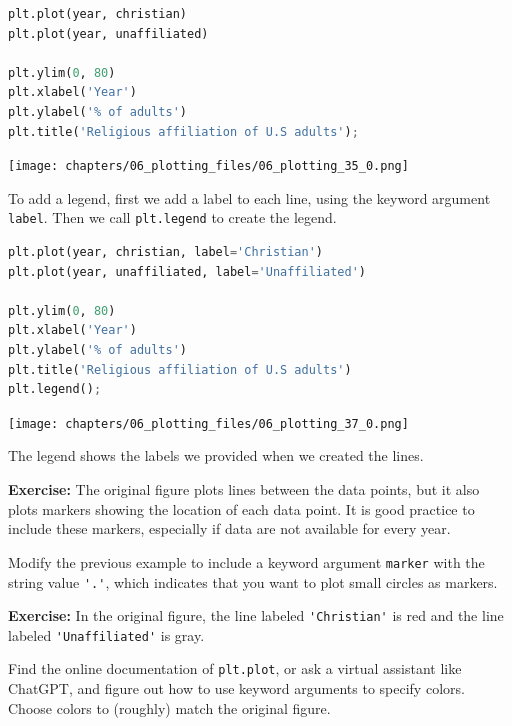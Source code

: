 \begin{lstlisting}[language=Python,style=source]
plt.plot(year, christian)
plt.plot(year, unaffiliated)

plt.ylim(0, 80)
plt.xlabel('Year')
plt.ylabel('% of adults')
plt.title('Religious affiliation of U.S adults');
\end{lstlisting}

\begin{center}
\texttt{[image: chapters/06\_plotting\_files/06\_plotting\_35\_0.png]}
\end{center}

To add a legend, first we add a label to each line, using the keyword
argument \passthrough{\lstinline!label!}. Then we call
\passthrough{\lstinline!plt.legend!} to create the legend.

\begin{lstlisting}[language=Python,style=source]
plt.plot(year, christian, label='Christian')
plt.plot(year, unaffiliated, label='Unaffiliated')

plt.ylim(0, 80)
plt.xlabel('Year')
plt.ylabel('% of adults')
plt.title('Religious affiliation of U.S adults')
plt.legend();
\end{lstlisting}

\begin{center}
\texttt{[image: chapters/06\_plotting\_files/06\_plotting\_37\_0.png]}
\end{center}

The legend shows the labels we provided when we created the lines.

\textbf{Exercise:} The original figure plots lines between the data
points, but it also plots markers showing the location of each data
point. It is good practice to include these markers, especially if data
are not available for every year.

Modify the previous example to include a keyword argument
\passthrough{\lstinline!marker!} with the string value
\passthrough{\lstinline!'.'!}, which indicates that you want to plot
small circles as markers.

\textbf{Exercise:} In the original figure, the line labeled
\passthrough{\lstinline!'Christian'!} is red and the line labeled
\passthrough{\lstinline!'Unaffiliated'!} is gray.

Find the online documentation of \passthrough{\lstinline!plt.plot!}, or
ask a virtual assistant like ChatGPT, and figure out how to use keyword
arguments to specify colors. Choose colors to (roughly) match the
original figure.

